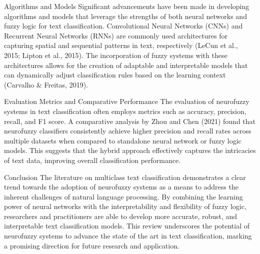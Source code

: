Algorithms and Models
Significant advancements have been made in developing algorithms and models that leverage the strengths of both neural networks and fuzzy logic for text classification. Convolutional Neural Networks (CNNs) and Recurrent Neural Networks (RNNs) are commonly used architectures for capturing spatial and sequential patterns in text, respectively (LeCun et al., 2015; Lipton et al., 2015). The incorporation of fuzzy systems with these architectures allows for the creation of adaptable and interpretable models that can dynamically adjust classification rules based on the learning context (Carvalho \& Freitas, 2019).

Evaluation Metrics and Comparative Performance
The evaluation of neurofuzzy systems in text classification often employs metrics such as accuracy, precision, recall, and F1 score. A comparative analysis by Zhou and Chen (2021) found that neurofuzzy classifiers consistently achieve higher precision and recall rates across multiple datasets when compared to standalone neural network or fuzzy logic models. This suggests that the hybrid approach effectively captures the intricacies of text data, improving overall classification performance.

Conclusion
The literature on multiclass text classification demonstrates a clear trend towards the adoption of neurofuzzy systems as a means to address the inherent challenges of natural language processing. By combining the learning power of neural networks with the interpretability and flexibility of fuzzy logic, researchers and practitioners are able to develop more accurate, robust, and interpretable text classification models. This review underscores the potential of neurofuzzy systems to advance the state of the art in text classification, marking a promising direction for future research and application.
